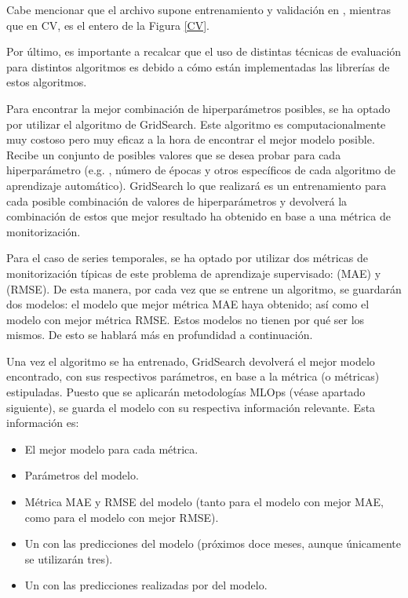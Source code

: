 Cabe mencionar que el archivo  supone entrenamiento y validación en , mientras que en CV, es el  entero de la Figura \ref{CV}.

Por último, es importante a recalcar que el uso de distintas técnicas de evaluación para distintos algoritmos es debido a cómo están implementadas las librerías de estos algoritmos.

Para encontrar la mejor combinación de hiperparámetros posibles, se ha optado por utilizar el algoritmo de GridSearch. Este algoritmo es computacionalmente muy costoso pero muy eficaz a la hora de encontrar el mejor modelo posible. Recibe un conjunto de posibles valores que se desea 
probar para cada hiperparámetro (e.g. , número de épocas y otros específicos de cada algoritmo de aprendizaje automático). GridSearch lo que realizará es un entrenamiento para cada posible combinación de valores de hiperparámetros y devolverá la combinación de estos que mejor resultado ha obtenido en base a una métrica de monitorización. 

Para el caso de series temporales, se ha optado por utilizar dos métricas de monitorización típicas de este problema de aprendizaje supervisado:  (MAE) y  (RMSE). De esta manera, por cada vez que se entrene un algoritmo, se guardarán dos  modelos: el modelo que mejor métrica MAE haya obtenido; así como el modelo con mejor métrica RMSE. Estos modelos no tienen por qué ser los mismos. De esto se hablará más en profundidad a continuación.

Una vez el algoritmo se ha entrenado, GridSearch devolverá el mejor modelo encontrado, con sus respectivos parámetros, en base a la métrica (o métricas) estipuladas. Puesto que se aplicarán metodologías MLOps (véase apartado siguiente), se guarda el modelo con su respectiva información relevante. Esta información es:
\begin{itemize}
    \item El mejor modelo para cada métrica.
    \item Parámetros del modelo.
    \item Métrica MAE y RMSE del modelo (tanto para el modelo con mejor MAE, como para el modelo con mejor RMSE).
    \item Un  con las predicciones del modelo (próximos doce meses, aunque únicamente se utilizarán tres).
    \item Un  con las predicciones realizadas por del modelo.
\end{itemize}

